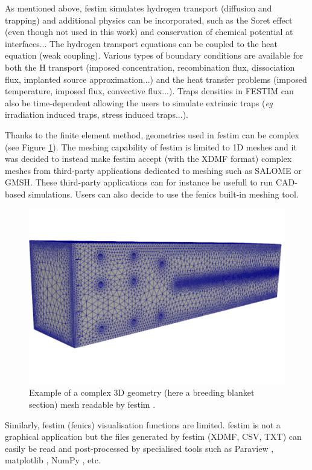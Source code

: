 As mentioned above, \gls{festim} simulates hydrogen transport (diffusion and trapping) and additional physics can be incorporated, such as the Soret effect (even though not used in this work) and conservation of chemical potential at interfaces...
The hydrogen transport equations can be coupled to the heat equation (weak coupling).
Various types of boundary conditions are available for both the H transport (imposed concentration, recombination flux, dissociation flux, implanted source approximation...) and the heat transfer problems (imposed temperature, imposed flux, convective flux...).
Traps densities in FESTIM can also be time-dependent allowing the users to simulate extrinsic traps (\textit{eg} irradiation induced traps, stress induced traps...).

Thanks to the finite element method, geometries used in \gls{festim} can be complex (see Figure \ref{fig: example mesh}).
The meshing capability of \gls{festim} is limited to 1D meshes and it was decided to instead make \gls{festim} accept (with the XDMF format) complex meshes from third-party applications dedicated to meshing such as SALOME or GMSH.
These third-party applications can for instance be usefull to run CAD-based simulations.
Users can also decide to use the \gls{fenics} built-in meshing tool.

\begin{figure}
    \centering
    \includegraphics[width=0.5\linewidth]{Figures/Chapter2/example_mesh.png}
    \caption{Example of a complex 3D geometry (here a breeding blanket section) mesh readable by \gls{festim} \cite{dark_influence_2021}.}
    \label{fig: example mesh}
\end{figure}

Similarly, \gls{festim} (\gls{fenics}) visualisation functions are limited.
\gls{festim} is not a graphical application but the files generated by \gls{festim} (XDMF, CSV, TXT) can easily be read and post-processed by specialised tools such as Paraview , matplotlib , NumPy , etc.

